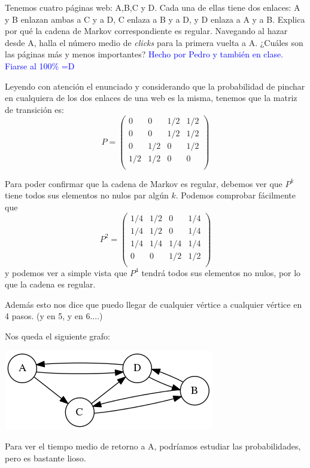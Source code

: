 \begin{problem}[6]
Tenemos cuatro páginas web: A,B,C y D. Cada una de ellas tiene dos enlaces: A y B enlazan ambas a C y a D, C enlaza a  B y a D, y D enlaza a A y a B. Explica por qué la cadena de Markov correspondiente es regular. Navegando al hazar desde A, halla el número medio de \textit{clicks} para la primera vuelta a A. ¿Cuáles son las páginas más y menos importantes?
	\solution
	\textcolor{blue}{Hecho por Pedro y también en clase. Fiarse al 100\%  =D}

	Leyendo con atención el enunciado y considerando que la probabilidad de pinchar en cualquiera de los dos enlaces de una web es la misma, tenemos que la matriz de transición es:
	\[P= \left( \begin{matrix}
	0&0&1/2&1/2\\
	0&0&1/2&1/2\\
	0&1/2&0&1/2\\
	1/2&1/2&0&0\\
	\end{matrix}\right)\]

	Para poder confirmar que la cadena de Markov es regular, debemos ver que $P^k$ tiene todos sus elementos no nulos par algún $k$. Podemos comprobar fácilmente que
	\[P^2= \left( \begin{matrix}
	1/4&1/2&0&1/4\\
	1/4&1/2&0&1/4\\
	1/4&1/4&1/4&1/4\\
	0&0&1/2&1/2\\
	\end{matrix}\right)\]
	y podemos ver a simple vista que $P^4$ tendrá todos sus elementos no nulos, por lo que la cadena es regular.

	Además esto nos dice que puedo llegar de cualquier vértice a cualquier vértice en 4 pasos. (y en 5, y en 6....)

	Nos queda el siguiente grafo:
	\begin{center}
	\includegraphics{tex/grafo_H2E6.png}
	\end{center}

Para ver el tiempo medio de retorno a A, podríamos estudiar las  probabilidades, pero es bastante lioso.


\end{problem}
